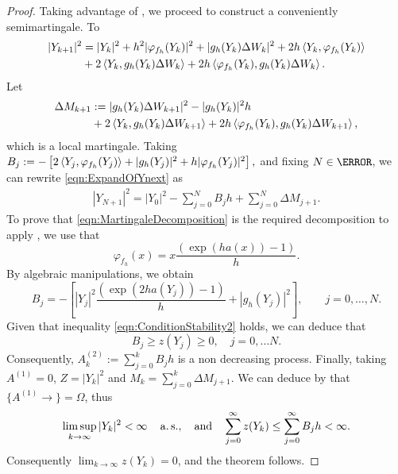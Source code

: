 \begin{proof}
	Taking advantage of , we proceed to construct a conveniently 
	semimartingale. To
	\begin{align}
		|Y_{k+1}|^2
			&=
				|Y_{k}|^2
				+h^2|\varphi_{f_h}(Y_{k})|^2 
				+|g_h(Y_k) \Delta W_k|^2 \notag 
				+2h\left\langle Y_k, \varphi_{f_h}(Y_{k})\right\rangle 
				\notag\\
			&
				+2\left\langle Y_k, g_h(Y_{k})\Delta W_k\right\rangle
				+2h\left\langle\varphi_{f_h}(Y_{k}), g_h(Y_{k})\Delta W_k\right\rangle.
			\label{eqn:ExpandOfYnext}
	\end{align}
	Let 
	\begin{align*}
		\Delta M_{k+1}
			&:=
				|g_h(Y_k)\Delta W_{k+1}|^2 - |g_h(Y_k)|^2 h \notag \\
			&
			+2\left\langle Y_k, g_h(Y_{k})\Delta W_{k+1}\right\rangle
			+2h\left\langle\varphi_{f_h}(Y_{k}), g_h(Y_{k})\Delta W_{k+1}\right\rangle, \notag
	\end{align*}
	which is a local martingale.
	Taking
	$ %
		B_j:=
			-\left[
					2\innerprod{Y_j}{\varphi_{f_h}(Y_j)}
					+|g_h(Y_j)|^2
				+h|\varphi_{f_h}(Y_j)|^2
			\right],
	$ %
	and fixing $N\in \N$, we can rewrite \eqref{eqn:ExpandOfYnext} as
	\begin{align}\label{eqn:MartingaleDecomposition}
		|Y_{N+1}|^2 = 
			|Y_0|^2
				-\sum_{j=0}^{N} B_j h
				+\sum_{j=0}^{N} \Delta M_{j+1}.
	\end{align} 
	To prove that \eqref{eqn:MartingaleDecomposition} is the required decomposition to apply
	, we use that
	\begin{equation}\label{eqn:varphih(x)}
		\varphi_{f_h}(x)
			= x\frac{\left(\exp(h a(x))-1\right)}{h}.
	\end{equation}
	By algebraic manipulations, we obtain
	\begin{equation*}
		B_j=
		-\left[
			|Y_j|^2\frac{(\exp(2h a(Y_j))-1)}{h}
			+|g_h(Y_j)|^2
		\right],
		\qquad
		 j=0,\dots,N.
	\end{equation*}
	Given that inequality \eqref{eqn:ConditionStability2} holds, we can deduce that
	$$
		B_j\geq z(Y_j) \geq 0, \quad j=0,\ldots N.
	$$
	Consequently, $A_k^{(2)}:=\sum_{j=0}^k B_jh$ is a non decreasing process.
	Finally, taking $A^{(1)}=0$,  $Z=|Y_k|^2$ and $M_k=\sum_{j=0}^k \Delta M_{j+1}$.
	We can deduce  by  that $\{A^{(1)}\to\}=\Omega$, thus
	\begin{align*}
	 \limsup_{k\to \infty}
			|Y_k|^2 < \infty \quad \operatorname*{a.s.},
		\quad \text{and} \quad
		\sum_{j=0}^\infty z(Y_k) 
		\leq 
		\sum_{j=0}^\infty B_jh < \infty.
	\end{align*}
	Consequently
	$
		\lim_{k\to \infty} z(Y_k) =0
	$,
	and the theorem follows.
\end{proof}
%
